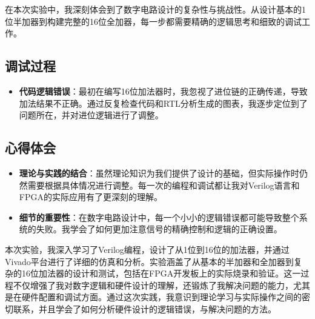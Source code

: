 \documentclass[a4,10pt,zihao=-4]{ctexart}
\begin{document}
在本次实验中，我深刻体会到了数字电路设计的复杂性与挑战性。从设计基本的1位半加器到构建完整的16位全加器，每一步都需要精确的逻辑思考和细致的调试工作。

\subsection{调试过程}

\begin{itemize}
    \item \textbf{代码逻辑错误}：最初在编写16位加法器时，我忽视了进位链的正确传递，导致加法结果不正确。通过反复检查代码和RTL分析生成的图表，我逐步定位到了问题所在，并对进位逻辑进行了调整。


\end{itemize}


\subsection{心得体会}

\begin{itemize}
    \item \textbf{理论与实践的结合}：虽然理论知识为我们提供了设计的基础，但实际操作时仍然需要根据具体情况进行调整。每一次的编程和调试都让我对Verilog语言和FPGA的实际应用有了更深刻的理解。
    
    \item \textbf{细节的重要性}：在数字电路设计中，每一个小小的逻辑错误都可能导致整个系统的失败。我学会了如何更加注意信号的精确控制和逻辑的正确设置。
    
\end{itemize}


本次实验，我深入学习了Verilog编程，设计了从1位到16位的加法器，并通过Vivado平台进行了详细的仿真和分析。实验涵盖了从基本的半加器和全加器到复杂的16位加法器的设计和测试，包括在FPGA开发板上的实际烧录和验证。这一过程不仅增强了我对数字逻辑和硬件设计的理解，还锻炼了我解决问题的能力，尤其是在硬件配置和调试方面。通过这次实践，我意识到理论学习与实际操作之间的密切联系，并且学会了如何分析硬件设计的逻辑错误，与解决问题的方法。
\end{document}
